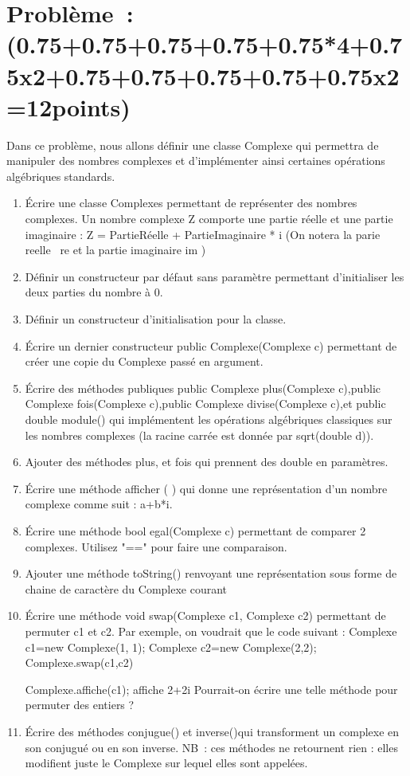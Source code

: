\section*{Problème : \scriptsize{(0.75+0.75+0.75+0.75+0.75*4+0.75x2+0.75+0.75+0.75+0.75+0.75x2=12points)}}

Dans ce problème, nous allons définir une classe Complexe qui permettra de manipuler des nombres complexes et d’implémenter ainsi certaines opérations algébriques standards.
\begin{enumerate}
    \item  Écrire une classe Complexes permettant de représenter des nombres complexes. Un nombre complexe Z comporte une partie réelle et une partie imaginaire : Z = PartieRéelle + PartieImaginaire * i
          (On notera la parie reelle  re et la partie imaginaire im )
    \item  Définir un constructeur par défaut sans paramètre permettant d’initialiser les deux parties du nombre à 0.
    \item  Définir un constructeur d’initialisation pour la classe.
    \item  Écrire un dernier constructeur public Complexe(Complexe c) permettant de créer une copie du Complexe passé en argument.
    \item  Écrire des méthodes publiques public Complexe plus(Complexe c),public Complexe fois(Complexe c),public Complexe divise(Complexe c),et public double module() qui implémentent les opérations algébriques classiques sur les nombres complexes (la racine carrée est donnée par sqrt(double d)).
    \item Ajouter des méthodes plus, et fois qui prennent des double en paramètres.
    \item Écrire une méthode afficher ( ) qui donne une représentation d'un nombre complexe comme suit : a+b*i.

    \item Écrire une méthode bool egal(Complexe c) permettant de comparer 2 complexes. Utilisez "==" pour faire une comparaison.
    \item Ajouter une méthode  toString() renvoyant une représentation sous forme de chaine de caractère du Complexe courant
    \item Écrire une méthode  void swap(Complexe c1, Complexe c2) permettant de permuter c1 et c2. Par exemple, on voudrait que le code suivant :
          Complexe c1=new Complexe(1, 1);
          Complexe c2=new Complexe(2,2);
          Complexe.swap(c1,c2)

          Complexe.affiche(c1); affiche    2+2i
          Pourrait-on  écrire une telle méthode pour permuter des entiers ?
    \item  Écrire des méthodes  conjugue() et inverse()qui transforment un complexe en son conjugué ou en son inverse.
          NB : ces méthodes ne retournent rien : elles modifient juste le Complexe sur lequel elles sont appelées.
\end{enumerate}
